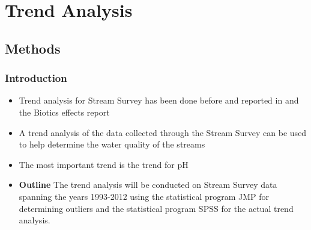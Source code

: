 \chapter{Trend Analysis}\label{ch:TA}
\section{Methods}
\subsection{Introduction}
\begin{itemize}
	\item Trend analysis for Stream Survey has been done before and reported in \citep{robinson2008ph} and the Biotics effects report \citep{cai2012}
	\item A trend analysis of the data collected through the Stream Survey can be used to help determine the water quality of the streams
	\item The most important trend is the trend for pH
	\item {\bf Outline} The trend analysis will be conducted on Stream Survey data spanning the years 1993-2012 using the statistical program JMP 
	for determining outliers and the statistical program SPSS for the actual trend analysis.
\end{itemize}
